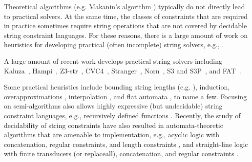  

Theoretical algorithms  (e.g. Makanin's algorithm \cite{Makanin}) typically do not directly lead to  practical solvers. At the same time, the classes of constraints that are 
 required in practice sometimes require string operations that are not covered by
 decidable string constraint languages.
 For these reasons,
 there is a large amount of work on heuristics for developing practical
 (often incomplete) string solvers, e.g., 
 \cite{BTV09,Berkeley-JavaScript,HAMPI,Stranger,YABI14,Abdulla14,fang-yu-circuits,Abdulla17,HJLRV18,S3,TCJ16,Z3-str,Z3-str2,cvc4,Saner,RVG12}.
 
 A large amount of recent work develops practical string solvers
 including  Kaluza~\cite{Berkeley-JavaScript}, Hampi~\cite{HAMPI}, 
 Z3-str~\cite{Z3-str}, CVC4~\cite{cvc4}, Stranger~\cite{YABI14}, Norn~\cite{Abdulla14}, S3 and S3P~\cite{S3,TCJ16}, and FAT~\cite{Abdulla17}.
 
 
 
 
 Some practical heuristics include
 bounding string lengths (e.g. \cite{HAMPI,Berkeley-JavaScript,BTV09}), 
 induction, overapproximations \cite{Stranger,YABI14}, interpolation
 \cite{Abdulla14}, and flat automata \cite{Abdulla17}, to name a few. 
 Focusing on semi-algorithms also allows highly expressive (but undecidable) 
 string 
 constraint languages, e.g., recursively defined functions \cite{S3,TCJ16}. 
 Recently, the study of decidability of string constraints have also resulted in
 automata-theoretic algorithms that are amenable to implementation, e.g.,
 acyclic logic with concatenation, regular constraints, and length constraints 
 \cite{Abdulla14}, and straight-line logic with finite transducers (or
 replaceall), concatenation, and regular constraints 
 \cite{HJLRV18,fang-yu-circuits,yan-tool}. 
 

